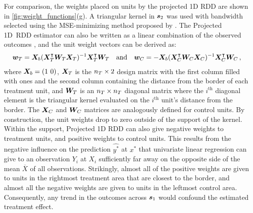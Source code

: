 	For comparison, the weights placed on units by the projected 1D RDD are shown in \autoref{fig:weight_functions}(g).
A triangular kernel in \(\bm{s}_2\) was used with bandwidth selected using the MSE-minimizing method proposed by \cite{imbens2012optimal}.
The Projected 1D~RDD estimator can also be written as a linear combination of the observed outcomes , and the unit weight vectors can be derived as:
\begin{equation}
\wt = \Xmat_b (\Xmat_\treat\trans \Wmat_\treat \Xmat_\treat)^{-1} \Xmat_\treat\trans \Wmat_\treat %
\quad\text{and}\quad
\wc = - \Xmat_b (\Xmat_\ctrol\trans \Wmat_\ctrol \Xmat_\ctrol)^{-1} \Xmat_\ctrol\trans \Wmat_\ctrol \,, 
\label{eq:unit_weights_llr}
\end{equation}
where \(\bm{X}_b = \left\lparen1~0\right\rparen\), \(\bm{X}_T\) is the \(n_T \times 2\) design matrix with the first column filled with ones and the second column containing the distance from the border of each treatment unit, and \(\bm{W}_T\) is an \(n_T \times n_T\) diagonal matrix where the \(i^\mathrm{th}\) diagonal element is the triangular kernel evaluated on the \(i^\mathrm{th}\) unit's distance from the border.
The \(\bm{X}_C\) and \(\bm{W}_C\) matrices are analogously defined for control units.
By construction, the unit weights drop to zero outside of the support of the kernel.
Within the support, Projected 1D RDD can also give negative weights to treatment units, and positive weights to control units.
This results from the negative influence on the prediction \(\widehat{y^*}\) at \(x^*\) that univariate linear regression can give to an observation \(Y_i\) at \(X_i\) sufficiently far away on the opposite side of the mean \(\overline{X}\) of all observations.
Strikingly, almost all of the positive weights are given to units in the rightmost treatment area that are closest to the border, and almost all the negative weights are given to units in the leftmost control area.
Consequently, any trend in the outcomes across \(\bm{s}_1\) would confound the estimated treatment effect.

